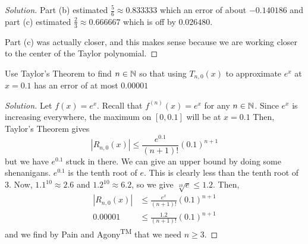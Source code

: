 \begin{enumerate}[(a)]
\begin{proof}[Solution]
          Part (b) estimated $\frac56 \approx 0.833333$ which an error of about $-0.140186$
          and part (c) estimated $\frac23 \approx 0.666667$ which is off by $0.026480$.

          Part (c) was actually closer, and this makes sense because we are working closer
          to the center of the Taylor polynomial.
        \end{proof}
\end{enumerate}


\question Use Taylor's Theorem to find $n\in\mathbb{N}$ so that using $T_{n,0}(x)$
to approximate $e^x$ at $x=0.1$ has an error of at most $0.00001$
\begin{proof}[Solution]
  Let $f(x) = e^x$. Recall that $f^{(n)}(x) = e^x$ for any $n \in \mathbb{N}$.
  Since $e^x$ is increasing everywhere, the maximum on $[0,0.1]$ will be at $x=0.1$
  Then, Taylor's Theorem gives
  \[ |R_{n,0}(x)| \leq \frac{e^{0.1}}{(n+1)!}(0.1)^{n+1} \]
  but we have $e^{0.1}$ stuck in there.
  We can give an upper bound by doing some shenanigans.
  $e^0.1$ is the tenth root of $e$.
  This is clearly less than the tenth root of 3.
  Now, $1.1^{10} \approx 2.6$ and $1.2^{10} \approx 6.2$, so we give $\sqrt[10]{e} \leq 1.2$. Then,
  \begin{align*}
    |R_{n,0}(x)| & \leq \frac{e^x}{(n+1)!}(0.1)^{n+1} \\
    0.00001      & \leq \frac{1.2}{(n+1)!}(0.1)^{n+1}
  \end{align*}
  and we find by Pain and Agony\textsuperscript{TM} that we need $n \geq 3$.
\end{proof}



